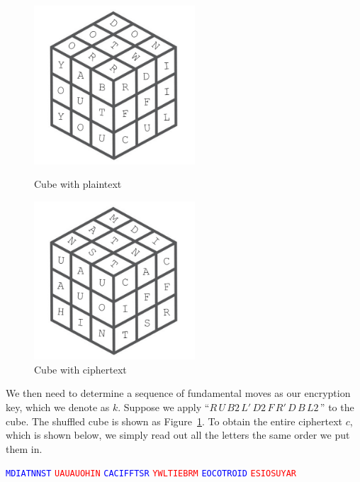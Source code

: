 \begin{figure}[ht]
    \centering
    \begin{minipage}{0.45\textwidth}
        \centering
        \includegraphics[width=6cm]{figures/encryption/cube_plain_text.png}
        \caption{Cube with plaintext}\label{fig:cube-plain-text}
    \end{minipage}
    \begin{minipage}{0.45\textwidth}
        \centering
        \includegraphics[width=6cm]{figures/encryption/cube_cipher_text.png}
        \caption{Cube with ciphertext}\label{fig:cube-cipher-text}
    \end{minipage}
\end{figure}
We then need to determine a sequence of fundamental moves as our encryption key, which we denote as $k$. Suppose we apply ``$R\,U\,B2\,L'\,D2\,F\,R'\,D\,B\,L2\,$'' to the cube. The shuffled cube is shown as Figure~\ref{fig:cube-cipher-text}. To obtain the entire ciphertext $c$, which is shown below, we simply read out all the letters the same order we put them in. 
\begin{center}
    \textcolor{blue}{\texttt{MDIATNNST}} \; \textcolor{red}{\texttt{UAUAUOHIN}} \; \textcolor{blue}{\texttt{CACIFFTSR}} \; 
    \textcolor{red}{\texttt{YWLTIEBRM}} \; \textcolor{blue}{\texttt{EOCOTROID}} \; \textcolor{red}{\texttt{ESIOSUYAR}}
\end{center}
